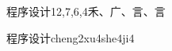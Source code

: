 \begin{entry}{程序设计}{12,7,6,4}{⽲、⼴、⾔、⾔}
  \begin{phonetics}{程序设计}{cheng2xu4she4ji4}
  \end{phonetics}
\end{entry}
